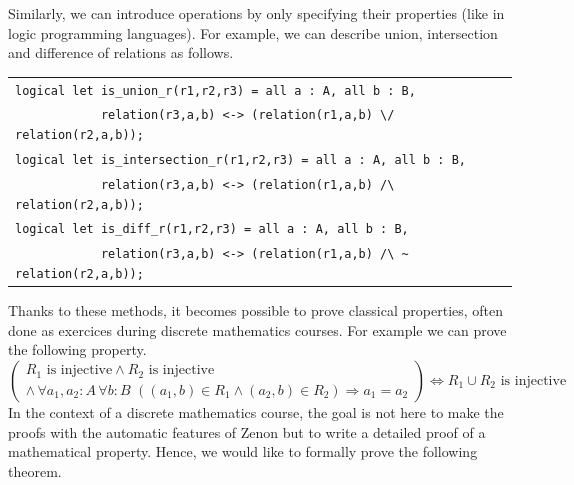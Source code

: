 \documentclass[submission,copyright,creativecommons]{eptcs}
\begin{document}
\noindent
Similarly, we can introduce
operations by only
specifying their properties (like in logic programming languages). For
example, we can describe union, intersection and difference of
relations as follows.

\begin{center}
\begin{scriptsize}
\begin{tabular}{|l|}
\hline
\verb+logical let is_union_r(r1,r2,r3) = all a : A, all b : B,+\\ 
\verb+            relation(r3,a,b) <-> (relation(r1,a,b) \/ relation(r2,a,b));+\\
\verb+logical let is_intersection_r(r1,r2,r3) = all a : A, all b : B, +\\
\verb+            relation(r3,a,b) <-> (relation(r1,a,b) /\ relation(r2,a,b));+\\
\verb+logical let is_diff_r(r1,r2,r3) = all a : A, all b : B, +\\
\verb+            relation(r3,a,b) <-> (relation(r1,a,b) /\ ~ relation(r2,a,b));+\\
\hline
\end{tabular}
\end{scriptsize}
\end{center}

\noindent
Thanks to these methods, it becomes possible to prove classical
properties, often done as exercices during discrete mathematics
courses. For example we can prove the following property.
\[
\left (
\begin{array}{l}
R_1 \, \, \mbox{is injective}
\land 
R_2 \, \, \mbox{is injective} \\
\land \, \forall a_1,a_2:A \, \forall b:B \, \, ((a_1,b) \in R_1 \land
(a_2,b) \in R_2) \Rightarrow a_1=a_2
\end{array}
\right ) \Leftrightarrow
R_1 \cup R_2 \, \, \mbox{is injective} 
\]
In the context of a discrete mathematics course, the goal is
not here to make the proofs with the automatic features of Zenon but to
write a detailed proof of a mathematical property. Hence, we would
like to formally prove the following theorem.
\end{document}
